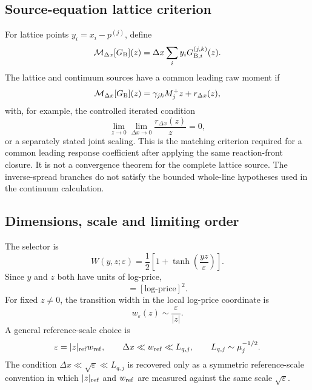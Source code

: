 \documentclass[5p,final]{elsarticle}
\begin{document}
\subsection{Source-equation lattice criterion}

For lattice points $y_i=x_i-p^{(j)}$, define
\begin{equation}
    \mathcal M_{\Delta x}[G_{\rm B}](z)
    =\Delta x\sum_i y_iG_{{\rm B},i}^{(j,k)}(z).
\end{equation}
The lattice and continuum sources have a common leading raw moment if
\begin{equation}
    \mathcal M_{\Delta x}[G_{\rm B}](z)
    =\gamma_{jk}M_j^+z+r_{\Delta x}(z),
\end{equation}
with, for example, the controlled iterated condition
\begin{equation}
    \lim_{z\to0}\lim_{\Delta x\to0}
    \frac{r_{\Delta x}(z)}{z}=0,
\end{equation}
or a separately stated joint scaling. This is the matching criterion required for a common leading response coefficient after applying the same reaction-front closure. It is not a convergence theorem for the complete lattice source. The inverse-spread branches do not satisfy the bounded whole-line hypotheses used in the continuum calculation.

\subsection{Dimensions, scale and limiting order}

The selector is
\begin{equation}
    W(y,z;\varepsilon)
    =\frac12\left[1+\tanh\!\left(\frac{yz}{\varepsilon}\right)\right].
\end{equation}
Since $y$ and $z$ both have units of log-price,
\begin{equation}
    [\varepsilon]=[\mathrm{log\text{-}price}]^2.
\end{equation}
For fixed $z\neq0$, the transition width in the local log-price coordinate is
\begin{equation}
    w_\varepsilon(z)\sim\frac{\varepsilon}{|z|}.
\end{equation}
A general reference-scale choice is
\begin{equation}
    \varepsilon=|z|_{\rm ref}w_{\rm ref},
    \qquad
    \Delta x\ll w_{\rm ref}\ll L_{q,j},
    \qquad
    L_{q,j}\sim\mu_j^{-1/2}.
\end{equation}
The condition $\Delta x\ll\sqrt\varepsilon\ll L_{q,j}$ is recovered only as a symmetric reference-scale convention in which $|z|_{\rm ref}$ and $w_{\rm ref}$ are measured against the same scale $\sqrt\varepsilon$.
\end{document}
